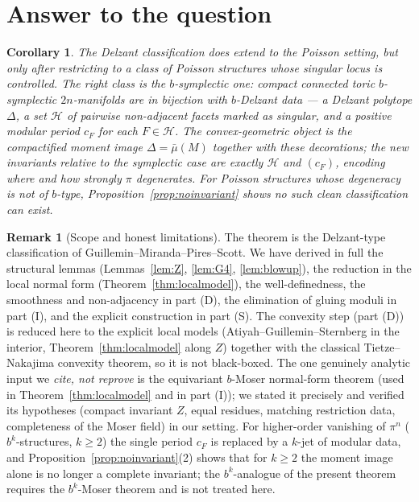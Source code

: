 \documentclass{amsart}
\newtheorem{corollary}{Corollary}
\theoremstyle{definition}
\newtheorem{remark}{Remark}
\begin{document}
\section{Answer to the question}

\begin{corollary}
The Delzant classification \emph{does} extend to the Poisson setting, but only
after restricting to a class of Poisson structures whose singular locus is
controlled. The right class is the $b$-symplectic one: compact connected toric
$b$-symplectic $2n$-manifolds are in bijection with $b$-Delzant data --- a
Delzant polytope $\Delta$, a set $\mathcal H$ of pairwise non-adjacent facets
marked as singular, and a positive modular period $c_F$ for each $F\in\mathcal
H$. The convex-geometric object is the compactified moment image $\Delta=
\bar\mu(M)$ together with these decorations; the new invariants relative to the
symplectic case are exactly $\mathcal H$ and $(c_F)$, encoding where and how
strongly $\pi$ degenerates. For Poisson structures whose degeneracy is \emph{not}
of $b$-type, Proposition~\ref{prop:noinvariant} shows no such clean
classification can exist.
\end{corollary}

\begin{remark}[Scope and honest limitations]
The theorem is the Delzant-type classification of
Guillemin--Miranda--Pires--Scott. We have derived in full the structural
lemmas (Lemmas~\ref{lem:Z}, \ref{lem:G4}, \ref{lem:blowup}), the reduction in
the local normal form (Theorem~\ref{thm:localmodel}), the well-definedness,
the smoothness and non-adjacency in part (D), the elimination of gluing moduli
in part (I), and the explicit construction in part (S). The convexity step (part (D)) is reduced here to the explicit local models
(Atiyah--Guillemin--Sternberg in the interior, Theorem~\ref{thm:localmodel}
along $Z$) together with the classical Tietze--Nakajima convexity theorem, so it
is not black-boxed. The one genuinely analytic input we \emph{cite, not reprove}
is the equivariant $b$-Moser normal-form theorem (used in
Theorem~\ref{thm:localmodel} and in part (I)); we stated it precisely and
verified its hypotheses (compact invariant $Z$, equal residues, matching
restriction data, completeness of the Moser field) in our setting. For higher-order vanishing of $\pi^n$
($b^k$-structures, $k\ge2$) the single period $c_F$ is replaced by a $k$-jet of
modular data, and Proposition~\ref{prop:noinvariant}(2) shows that for $k\ge2$
the moment image alone is no longer a complete invariant; the $b^k$-analogue of
the present theorem requires the $b^k$-Moser theorem and is not treated here.
\end{remark}
\end{document}
